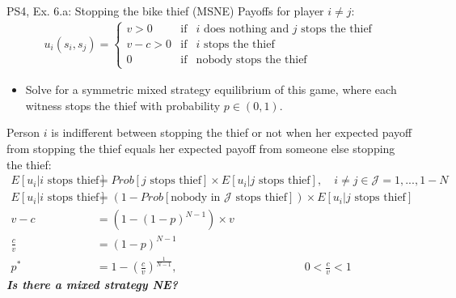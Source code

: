 \begin{frame}{PS4, Ex. 6.a: Stopping the bike thief (MSNE)}
    Payoffs for player $i\neq j$:
    \begin{align*}
      u_i(s_i,s_j)=
      \left\{ \begin{array}{rcl}
      v > 0 & \mbox{if} & \mbox{$i$ does nothing and $j$ stops the thief} \\
      v-c>0 & \mbox{if} & \mbox{$i$ stops the thief} \\
      0     & \mbox{if} & \mbox{nobody stops the thief}
      \end{array}\right.
    \end{align*}
    \vspace{-12pt}
    \begin{itemize}
      \item[a)] Solve for a symmetric mixed strategy equilibrium of this game, where each witness stops the thief with probability $p\in(0,1)$.
    \end{itemize}
    Person $i$ is indifferent between stopping the thief or not when her expected payoff from stopping the thief equals her expected payoff from someone else stopping the thief:
    \begin{align*}
        E[u_i|i\text{ stops thief}]&=Prob[j\text{ stops thief}]\times E[u_i|j\text{ stops thief}],\quad i\neq j\in \mathcal{J}=1,...,1-N\\
        E[u_i|i\text{ stops thief}]&=\left(1-Prob[\text{nobody in $\mathcal{J}$ stops thief}]\right)\times E[u_i|j\text{ stops thief}]\\
        v-c&=\left(1-(1-p)^{N-1}\right)\times v\\
        \frac{c}{v}&=(1-p)^{N-1}\\
        p^{*}&=1-\left(\frac{c}{v}\right)^{\frac{1}{N-1}},
        \quad\quad\quad\quad\quad\quad\quad\quad\quad\quad\quad\ 0<\frac{c}{v}<1
    \end{align*}
    \textbf{\textit{Is there a mixed strategy NE?}}
  \vfill\null
\end{frame}
